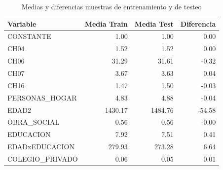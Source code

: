 \begin{table}
\caption{Medias y diferencias muestras de entrenamiento y de testeo}
\label{tab:medias}
\begin{tabular}{lrrr}
\toprule
Variable & Media Train & Media Test & Diferencia \\
\midrule
CONSTANTE & 1.00 & 1.00 & 0.00 \\
CH04 & 1.52 & 1.52 & 0.00 \\
CH06 & 31.29 & 31.61 & -0.32 \\
CH07 & 3.67 & 3.63 & 0.04 \\
CH16 & 1.47 & 1.50 & -0.03 \\
PERSONAS_HOGAR & 4.83 & 4.88 & -0.04 \\
EDAD2 & 1430.17 & 1484.76 & -54.58 \\
OBRA_SOCIAL & 0.56 & 0.56 & -0.00 \\
EDUCACION & 7.92 & 7.51 & 0.41 \\
EDADxEDUCACION & 279.93 & 273.28 & 6.64 \\
COLEGIO_PRIVADO & 0.06 & 0.05 & 0.01 \\
\bottomrule
\end{tabular}
\end{table}
